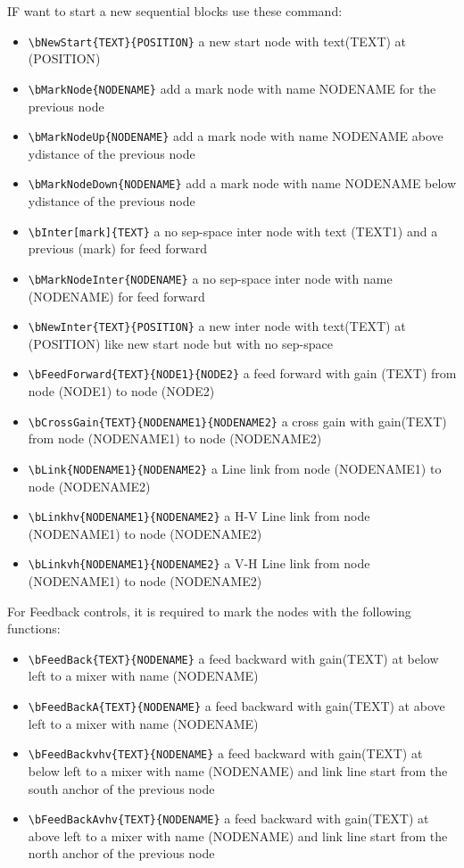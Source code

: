 \documentclass[a4paper,onecolumn]{IEEETran}
\begin{document}
IF want to start a new sequential blocks use these command:

\begin{itemize}
\item \verb|\bNewStart{TEXT}{POSITION}| a new start node with text(TEXT) at (POSITION)
\item \verb|\bMarkNode{NODENAME}| add a mark node with name {NODENAME} for the previous node
\item \verb|\bMarkNodeUp{NODENAME}| add a mark node with name {NODENAME} above ydistance of the previous node
\item \verb|\bMarkNodeDown{NODENAME}| add a mark node with name {NODENAME} below ydistance of the previous node
\item \verb|\bInter[mark]{TEXT}| a no sep-space inter node with text (TEXT1) and a previous (mark) for feed forward
\item \verb|\bMarkNodeInter{NODENAME}| a no sep-space inter node with name (NODENAME)  for feed forward
\item \verb|\bNewInter{TEXT}{POSITION}| a new inter node with text(TEXT) at (POSITION) like new start node but with no sep-space
\item \verb|\bFeedForward{TEXT}{NODE1}{NODE2}| a feed forward with gain (TEXT) from node (NODE1) to node (NODE2)
\item \verb|\bCrossGain{TEXT}{NODENAME1}{NODENAME2}| a cross gain with gain(TEXT) from node (NODENAME1) to node (NODENAME2)
\item \verb|\bLink{NODENAME1}{NODENAME2}| a Line link from node (NODENAME1) to node (NODENAME2)
\item \verb|\bLinkhv{NODENAME1}{NODENAME2}| a H-V Line link from node (NODENAME1) to node (NODENAME2)
\item \verb|\bLinkvh{NODENAME1}{NODENAME2}| a V-H Line link from node (NODENAME1) to node (NODENAME2)
\end{itemize}



For Feedback controls, it is required to mark the nodes with the following functions:

\begin{itemize}
\item \verb|\bFeedBack{TEXT}{NODENAME}| a feed backward with gain(TEXT) at below left to a mixer with name (NODENAME)
\item \verb|\bFeedBackA{TEXT}{NODENAME}| a feed backward with gain(TEXT) at above left to a mixer with name (NODENAME)
\item \verb|\bFeedBackvhv{TEXT}{NODENAME}| a feed backward with gain(TEXT) at below left to a mixer with name (NODENAME) and link line start from the south anchor of the previous node
\item \verb|\bFeedBackAvhv{TEXT}{NODENAME}| a feed backward with gain(TEXT) at above left to a mixer with name (NODENAME) and link line start from the north anchor of the previous node
\end{itemize}
\end{document}
